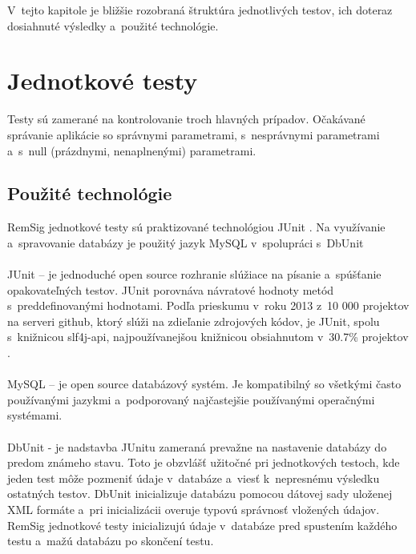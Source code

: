 \documentclass[
  digital, %
  table,   %
oneside,
  nolof,     %
  nolot,     %
]{fithesis3}
\begin{document}
  V~tejto kapitole je bližšie rozobraná štruktúra jednotlivých testov, ich doteraz dosiahnuté výsledky a~použité technológie.
\section{Jednotkové testy}
Testy sú zamerané na kontrolovanie troch hlavných prípadov. Očakávané správanie aplikácie so správnymi parametrami, s~nesprávnymi parametrami a~s~null (prázdnymi, nenaplnenými) parametrami.
\subsection{Použité technológie}
RemSig jednotkové testy sú praktizované technológiou  JUnit \cite{junit}. Na využívanie a~spravovanie databázy je použitý jazyk MySQL \cite{mySqlBible} v~spolupráci s~DbUnit \cite{dbunit}\paragraph{}
JUnit – je jednoduché open source rozhranie slúžiace na písanie a~spúšťanie opakovateľných testov. JUnit porovnáva návratové hodnoty metód s~preddefinovanými hodnotami. Podľa prieskumu v~roku 2013 z~10 000 projektov na serveri github, ktorý slúži na zdieľanie zdrojových kódov, je JUnit, spolu s~knižnicou slf4j-api, najpoužívanejšou knižnicou obsiahnutom v~30.7\% projektov \cite{gitHubAnalysis}. \paragraph{}
MySQL – je open source databázový systém. Je kompatibilný so všetkými často používanými jazykmi a~podporovaný najčastejšie používanými operačnými systémami.
\paragraph{}
DbUnit -  je nadstavba JUnitu zameraná prevažne na nastavenie databázy do predom známeho stavu. Toto je obzvlášť užitočné pri jednotkových testoch, kde jeden test môže pozmeniť údaje v~databáze a~viesť k~nepresnému výsledku ostatných testov. DbUnit inicializuje databázu pomocou  dátovej sady uloženej XML formáte a~pri inicializácii overuje typovú správnosť vložených údajov. 
RemSig jednotkové testy inicializujú údaje v~databáze pred  spustením  každého testu a~mažú databázu po skončení testu.  
\end{document}
